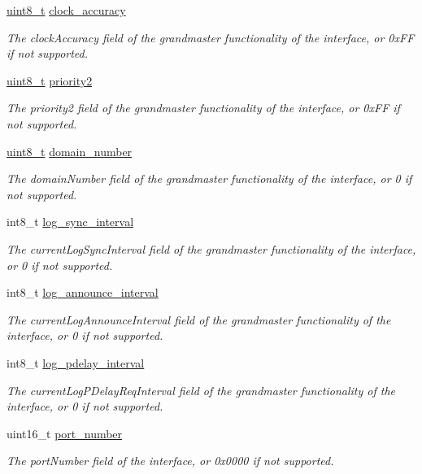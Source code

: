 \begin{DoxyCompactItemize}
\hyperlink{stdint_8h_aba7bc1797add20fe3efdf37ced1182c5}{uint8\+\_\+t} \hyperlink{class_offset_a708d6d971b6be997cf8d3e683951ceb0}{clock\+\_\+accuracy}
\begin{DoxyCompactList}\small\item\em The clock\+Accuracy field of the grandmaster functionality of the interface, or 0x\+FF if not supported. \end{DoxyCompactList}\item 
\hyperlink{stdint_8h_aba7bc1797add20fe3efdf37ced1182c5}{uint8\+\_\+t} \hyperlink{class_offset_ac04b889463a96b43985cb82020e3c39b}{priority2}
\begin{DoxyCompactList}\small\item\em The priority2 field of the grandmaster functionality of the interface, or 0x\+FF if not supported. \end{DoxyCompactList}\item 
\hyperlink{stdint_8h_aba7bc1797add20fe3efdf37ced1182c5}{uint8\+\_\+t} \hyperlink{class_offset_a96702548f5b9222af26319c695764b29}{domain\+\_\+number}
\begin{DoxyCompactList}\small\item\em The domain\+Number field of the grandmaster functionality of the interface, or 0 if not supported. \end{DoxyCompactList}\item 
int8\+\_\+t \hyperlink{class_offset_a2d4950b4c6da4dfa67688dcaf6139c9d}{log\+\_\+sync\+\_\+interval}
\begin{DoxyCompactList}\small\item\em The current\+Log\+Sync\+Interval field of the grandmaster functionality of the interface, or 0 if not supported. \end{DoxyCompactList}\item 
int8\+\_\+t \hyperlink{class_offset_a15bb50a04ecd3ec11563012afc7e24a7}{log\+\_\+announce\+\_\+interval}
\begin{DoxyCompactList}\small\item\em The current\+Log\+Announce\+Interval field of the grandmaster functionality of the interface, or 0 if not supported. \end{DoxyCompactList}\item 
int8\+\_\+t \hyperlink{class_offset_a26544b553c0b251da8e632533f260a5d}{log\+\_\+pdelay\+\_\+interval}
\begin{DoxyCompactList}\small\item\em The current\+Log\+P\+Delay\+Req\+Interval field of the grandmaster functionality of the interface, or 0 if not supported. \end{DoxyCompactList}\item 
uint16\+\_\+t \hyperlink{class_offset_af0afa7bb85d49ac5ff873fad86a48ec5}{port\+\_\+number}
\begin{DoxyCompactList}\small\item\em The port\+Number field of the interface, or 0x0000 if not supported. \end{DoxyCompactList}\end{DoxyCompactItemize}
